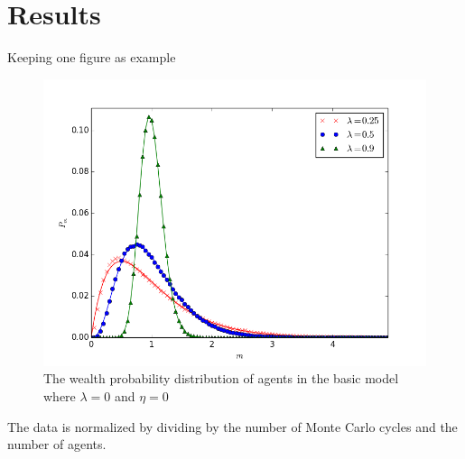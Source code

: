 \section{Results}
Keeping one figure as example

\begin{figure}[H]
\includegraphics[scale=0.7]{figures/the_beutifulest_plot_i_have_ever_seen.png}
\caption{The wealth probability distribution of agents in the basic model where $\lambda = 0$ and $\eta = 0$ }
\end{figure}
The data is normalized by dividing by the number of Monte Carlo cycles and the number of agents. 

